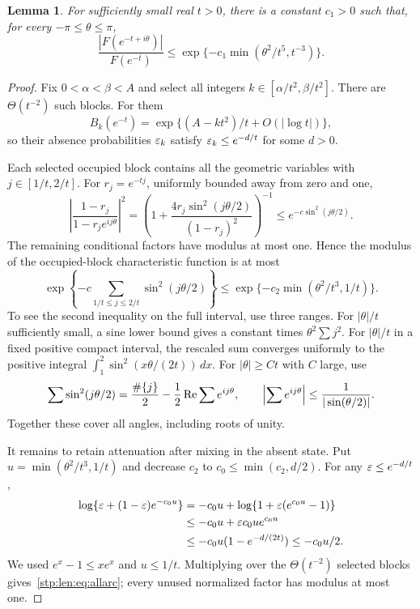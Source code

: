 \documentclass[11pt]{article}
\newtheorem{lemma}[theorem]{Lemma}
\theoremstyle{remark}\newtheorem{remark}[theorem]{Remark}
\begin{document}
\begin{lemma}\label{stp:len:lem:allarc}
For sufficiently small real $t>0$, there is a constant $c_1>0$ such that, for every $-\pi\le\theta\le\pi$,
\begin{equation}\label{stp:len:eq:allarc}
 \frac{|F(e^{-t+i\theta})|}{F(e^{-t})}
 \le\exp\{-c_1\min(\theta^2/t^5,t^{-3})\}.
\end{equation}
\end{lemma}
\begin{proof}
Fix $0<\alpha<\beta<A$ and select all integers $k\in[\alpha/t^2,\beta/t^2]$. There are $\Theta(t^{-2})$ such blocks. For them
\[
 B_k(e^{-t})=\exp\{(A-kt^2)/t+O(|\log t|)\},
\]
so their absence probabilities $\varepsilon_k$ satisfy $\varepsilon_k\le e^{-d/t}$ for some $d>0$.

Each selected occupied block contains all the geometric variables with $j\in[1/t,2/t]$. For $r_j=e^{-tj}$, uniformly bounded away from zero and one,
\[
 \left|\frac{1-r_j}{1-r_je^{ij\theta}}\right|^2
 =\left(1+\frac{4r_j\sin^2(j\theta/2)}{(1-r_j)^2}\right)^{-1}
 \le e^{-c\sin^2(j\theta/2)}.
\]
The remaining conditional factors have modulus at most one. Hence the modulus of the occupied-block characteristic function is at most
\begin{equation}\label{stp:len:eq:conditionalarc}
 \exp\left\{-c\sum_{1/t\le j\le2/t}\sin^2(j\theta/2)\right\}
 \le\exp\{-c_2\min(\theta^2/t^3,1/t)\}.
\end{equation}
To see the second inequality on the full interval, use three ranges. For $|\theta|/t$ sufficiently small, a sine lower bound gives a constant times $\theta^2\sum j^2$. For $|\theta|/t$ in a fixed positive compact interval, the rescaled sum converges uniformly to the positive integral $\int_1^2\sin^2(x\theta/(2t))\,dx$. For $|\theta|\ge Ct$ with $C$ large, use
\[
 \sum\sin^2(j\theta/2)=\frac{\#\{j\}}2-\frac12\operatorname{Re}\sum e^{ij\theta},
 \qquad \left|\sum e^{ij\theta}\right|\le\frac1{|\sin(\theta/2)|}.
\]
Together these cover all angles, including roots of unity.

It remains to retain attenuation after mixing in the absent state. Put $u=\min(\theta^2/t^3,1/t)$ and decrease $c_2$ to $c_0\le\min(c_2,d/2)$. For any $\varepsilon\le e^{-d/t}$,
\begin{align*}
 \log\{\varepsilon+(1-\varepsilon)e^{-c_0u}\}
 &=-c_0u+\log\{1+\varepsilon(e^{c_0u}-1)\}\\
 &\le-c_0u+\varepsilon c_0u e^{c_0u}\\
 &\le-c_0u(1-e^{-d/(2t)})\le-c_0u/2.
\end{align*}
We used $e^x-1\le xe^x$ and $u\le1/t$. Multiplying over the $\Theta(t^{-2})$ selected blocks gives~\eqref{stp:len:eq:allarc}; every unused normalized factor has modulus at most one.
\end{proof}
\end{document}
